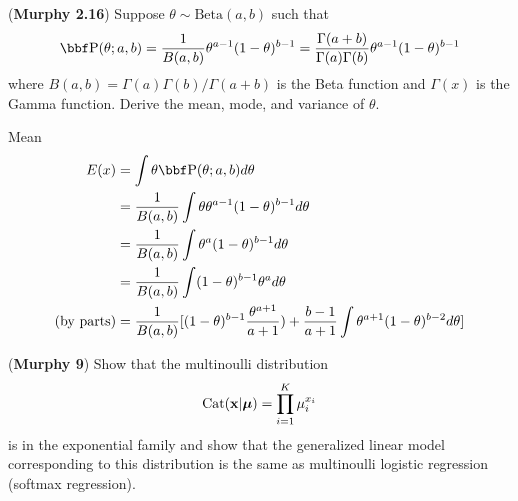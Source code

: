 \documentclass[12pt,letterpaper,fleqn]{hmcpset}
\begin{document}
\begin{problem}[1]
(\textbf{Murphy 2.16}) Suppose $\theta \sim \text{Beta}(a,b)$ such
        that
        \[
            \PP(\theta; a,b) = \frac{1}{B(a,b)} \theta^{a-1}(1-\theta)^{b-1} = \frac{\Gamma(a+b)}{\Gamma(a)\Gamma(b)} \theta^{a-1}(1-\theta)^{b-1}
        \]
        where $B(a,b) = \Gamma(a)\Gamma(b)/\Gamma(a+b)$ is the Beta function
        and $\Gamma(x)$ is the Gamma function.
        Derive the mean, mode, and variance of $\theta$.
\end{problem}
\begin{solution}

\item Mean
\begin{equation}\begin{aligned}
E(x) & = \int \theta \PP(\theta; a,b) d\theta \\
& = \frac{1}{B(a,b)} \int \theta \theta^{a-1}(1-\theta)^{b-1} d\theta \\
& = \frac{1}{B(a,b)} \int \theta^a(1-\theta)^{b-1} d\theta \\
& = \frac{1}{B(a,b)} \int (1-\theta)^{b-1} \theta^a d\theta \\
\text{(by parts)} & = \frac{1}{B(a,b)} [ (1-\theta)^{b-1} \frac{\theta^{a+1}}{a + 1} ) + \frac{b-1}{a+1} \int \theta^{a+1} (1-\theta)^{b-2} d\theta ] \\
\end{aligned}\end{equation}    



\vfill
\end{solution}
\newpage

\begin{problem}[2]
(\textbf{Murphy 9}) Show that the multinoulli distribution
\[
    \text{Cat}({\bf x}|\hbox{\boldmath$\mu$}) = \prod_{i=1}^K \mu_i^{x_i}
\]
is in the exponential family and show that the generalized linear model
corresponding to this distribution is the same as multinoulli logistic
regression (softmax regression).
\end{problem}
\begin{solution}
\vfill
\end{solution}
\newpage
\end{document}
